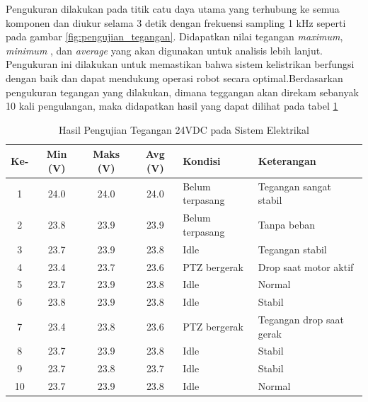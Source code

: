 Pengukuran dilakukan pada titik catu daya utama yang terhubung ke semua komponen dan diukur selama 3 detik dengan frekuensi sampling 1 kHz seperti pada gambar \ref{fig:pengujian_tegangan}. Didapatkan nilai tegangan \emph{maximum}, \emph{minimum }, dan \emph{average} yang akan digunakan untuk analisis lebih lanjut. Pengukuran ini dilakukan untuk memastikan bahwa sistem kelistrikan berfungsi dengan baik dan dapat mendukung operasi robot secara optimal.Berdasarkan pengukuran tegangan yang dilakukan, dimana teggangan akan direkam  sebanyak 10 kali pengulangan, maka didapatkan hasil yang dapat dilihat pada tabel \ref{tab:pengujian_tegangan}
\begin{table}[H]
	\centering
	\caption{Hasil Pengujian Tegangan 24VDC pada Sistem Elektrikal}
	\label{tab:pengujian_tegangan}
	\begin{tabular}{|c|c|c|c|l|l|}
		\hline
		\textbf{Ke-} & \textbf{Min (V)} & \textbf{Maks (V)} & \textbf{Avg (V)} & \textbf{Kondisi} & \textbf{Keterangan}      \\
		\hline
		1            & 24.0             & 24.0              & 24.0             & Belum terpasang  & Tegangan sangat stabil   \\
		2            & 23.8             & 23.9              & 23.9             & Belum terpasang  & Tanpa beban              \\
		3            & 23.7             & 23.9              & 23.8             & Idle             & Tegangan stabil          \\
		4            & 23.4             & 23.7              & 23.6             & PTZ bergerak     & Drop saat motor aktif    \\
		5            & 23.7             & 23.9              & 23.8             & Idle             & Normal                   \\
		6            & 23.8             & 23.9              & 23.8             & Idle             & Stabil                   \\
		7            & 23.4             & 23.8              & 23.6             & PTZ bergerak     & Tegangan drop saat gerak \\
		8            & 23.7             & 23.9              & 23.8             & Idle             & Stabil                   \\
		9            & 23.7             & 23.8              & 23.7             & Idle             & Stabil                   \\
		10           & 23.7             & 23.9              & 23.8             & Idle             & Normal                   \\
		\hline
	\end{tabular}
\end{table}

